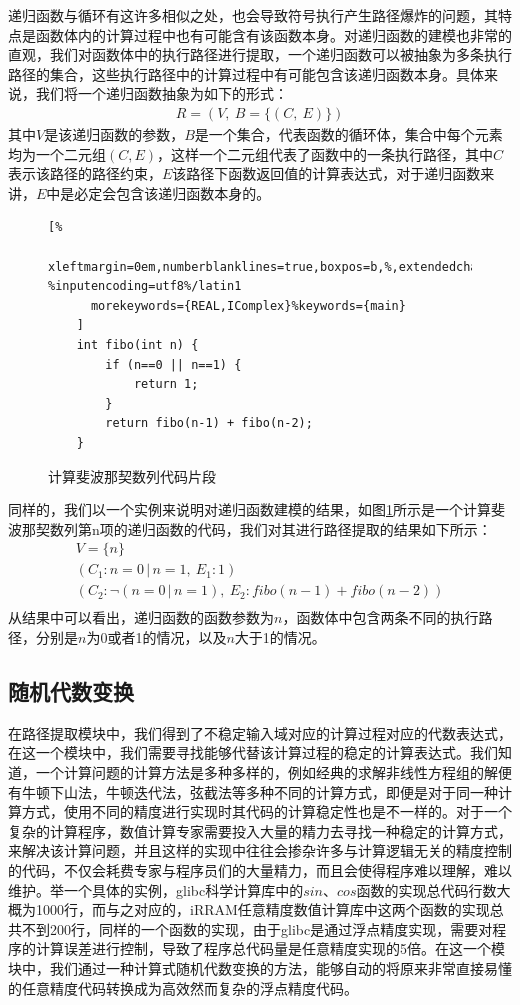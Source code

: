 递归函数与循环有这许多相似之处，也会导致符号执行产生路径爆炸的问题，其特点是函数体内的计算过程中也有可能含有该函数本身。对递归函数的建模也非常的直观，我们对函数体中的执行路径进行提取，一个递归函数可以被抽象为多条执行路径的集合，这些执行路径中的计算过程中有可能包含该递归函数本身。具体来说，我们将一个递归函数抽象为如下的形式：
\begin{gather*}
    R = (V,\ B = \{(C,\ E)\})
\end{gather*}
其中$V$是该递归函数的参数，$B$是一个集合，代表函数的循环体，集合中每个元素均为一个二元组$(C, E)$，这样一个二元组代表了函数中的一条执行路径，其中$C$表示该路径的路径约束，$E$该路径下函数返回值的计算表达式，对于递归函数来讲，$E$中是必定会包含该递归函数本身的。

\begin{figure}[htbp]
  \centering
  \begin{lstlisting}[%
      xleftmargin=0em,numberblanklines=true,boxpos=b,%,extendedchars=\true, %inputencoding=utf8%/latin1
      morekeywords={REAL,IComplex}%keywords={main}
    ]
    int fibo(int n) {
        if (n==0 || n==1) {
            return 1;
        }
        return fibo(n-1) + fibo(n-2);
    }
  \end{lstlisting}
  \caption{计算斐波那契数列代码片段}\label{lst:fibocode}
\end{figure}

同样的，我们以一个实例来说明对递归函数建模的结果，如图\ref{lst:fibocode}所示是一个计算斐波那契数列第n项的递归函数的代码，我们对其进行路径提取的结果如下所示：
\begin{gather*}
  V = \{n\}\\
  (C_1: n=0\,|\,n=1,\ E_1: 1) \\
  (C_2: \neg (n=0\,|\,n=1),\ E_2: fibo(n-1)+fibo(n-2))\\
\end{gather*}
从结果中可以看出，递归函数的函数参数为$n$，函数体中包含两条不同的执行路径，分别是$n$为0或者1的情况，以及$n$大于1的情况。

\subsection{随机代数变换}

在路径提取模块中，我们得到了不稳定输入域对应的计算过程对应的代数表达式，在这一个模块中，我们需要寻找能够代替该计算过程的稳定的计算表达式。我们知道，一个计算问题的计算方法是多种多样的，例如经典的求解非线性方程组的解便有牛顿下山法，牛顿迭代法，弦截法等多种不同的计算方式，即便是对于同一种计算方式，使用不同的精度进行实现时其代码的计算稳定性也是不一样的。对于一个复杂的计算程序，数值计算专家需要投入大量的精力去寻找一种稳定的计算方式，来解决该计算问题，并且这样的实现中往往会掺杂许多与计算逻辑无关的精度控制的代码，不仅会耗费专家与程序员们的大量精力，而且会使得程序难以理解，难以维护。举一个具体的实例，glibc科学计算库中的$sin$、$cos$函数的实现总代码行数大概为1000行，而与之对应的，iRRAM任意精度数值计算库中这两个函数的实现总共不到200行，同样的一个函数的实现，由于glibc是通过浮点精度实现，需要对程序的计算误差进行控制，导致了程序总代码量是任意精度实现的5倍。在这一个模块中，我们通过一种计算式随机代数变换的方法，能够自动的将原来非常直接易懂的任意精度代码转换成为高效然而复杂的浮点精度代码。

